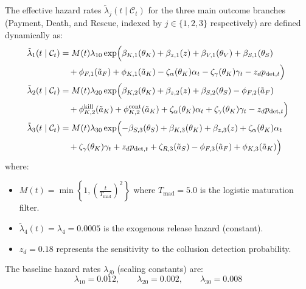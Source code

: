 \documentclass[12pt]{article}
\numberwithin{equation}{section}
\numberwithin{table}{section}
\begin{document}
The effective hazard rates $\tilde{\lambda}_j(t \mid \mathcal{C}_t)$ for the three main outcome branches (Payment, Death, and Rescue, indexed by $j \in \{1, 2, 3\}$ respectively) are defined dynamically as:
\begin{align}
\tilde{\lambda}_1(t \mid \mathcal{C}_t) &= M(t) \lambda_{10} \exp\Bigl( \beta_{K,1}(\theta_K) + \beta_{z,1}(z) + \beta_{V,1}(\theta_V) + \beta_{S,1}(\theta_S) \nonumber \\
&\quad + \phi_{F,1}(\tilde{a}_F) + \phi_{K,1}(\tilde{a}_K) - \zeta_{\alpha}(\theta_K) \alpha_t - \zeta_{\gamma}(\theta_K) \gamma_t - z_d p_{\text{det},t} \Bigr) \\
\tilde{\lambda}_2(t \mid \mathcal{C}_t) &= M(t) \lambda_{20} \exp\Bigl( \beta_{K,2}(\theta_K) + \beta_{z,2}(z) + \beta_{S,2}(\theta_S) - \phi_{F,2}(\tilde{a}_F) \nonumber \\
&\quad + \phi_{K,2}^{\text{kill}}(\tilde{a}_K) + \phi_{K,2}^{\text{cont}}(\tilde{a}_K) + \zeta_{\alpha}(\theta_K) \alpha_t + \zeta_{\gamma}(\theta_K) \gamma_t - z_d p_{\text{det},t} \Bigr) \\
\tilde{\lambda}_3(t \mid \mathcal{C}_t) &= M(t) \lambda_{30} \exp\Bigl( -\beta_{S,3}(\theta_S) + \beta_{K,3}(\theta_K) + \beta_{z,3}(z) + \zeta_{\alpha}(\theta_K) \alpha_t \nonumber \\
&\quad + \zeta_{\gamma}(\theta_K) \gamma_t + z_d p_{\text{det},t} + \zeta_{R,3}(\tilde{a}_S) - \phi_{F,3}(\tilde{a}_F) + \phi_{K,3}(\tilde{a}_K) \Bigr)
\end{align}
where:
\begin{itemize}
    \item $M(t) = \min\left\{1, \left(\frac{t}{T_{\text{mad}}}\right)^2\right\}$ where $T_{\text{mad}} = 5.0$ is the logistic maturation filter.
    \item $\tilde{\lambda}_4(t) = \lambda_4 = 0.0005$ is the exogenous release hazard (constant).
    \item $z_d = 0.18$ represents the sensitivity to the collusion detection probability.
\end{itemize}

The baseline hazard rates $\lambda_{j0}$ (scaling constants) are:
$$\lambda_{10} = 0.012,\qquad \lambda_{20} = 0.002,\qquad \lambda_{30} = 0.008$$
\end{document}
